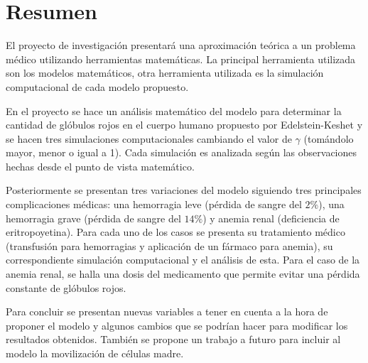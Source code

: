 \chapter*{Resumen}

El proyecto de investigación presentará una aproximación teórica a un problema médico utilizando herramientas matemáticas. La principal herramienta utilizada son los modelos matemáticos, otra herramienta utilizada es la simulación computacional de cada modelo propuesto.

En el proyecto se hace un análisis matemático del modelo para determinar la cantidad de glóbulos rojos en el cuerpo humano propuesto por Edelstein-Keshet y se hacen tres simulaciones computacionales cambiando el valor de $\gamma$ (tomándolo mayor, menor o igual a 1). Cada simulación es analizada según las observaciones hechas desde el punto de vista matemático. 

Posteriormente se presentan tres variaciones del modelo siguiendo tres principales complicaciones médicas: una hemorragia leve (pérdida de sangre del $2\%$), una hemorragia grave (pérdida de sangre del $14\%$) y anemia renal (deficiencia de eritropoyetina). Para cada uno de los casos se presenta su tratamiento médico (transfusión para hemorragias y aplicación de un fármaco para anemia), su correspondiente simulación computacional y el análisis de esta. Para el caso de la anemia renal, se halla una dosis del medicamento que permite evitar una pérdida constante de glóbulos rojos. 

Para concluir se presentan nuevas variables a tener en cuenta a la hora de proponer el modelo y algunos cambios que se podrían hacer para modificar los resultados obtenidos. También se propone un trabajo a futuro para incluir al modelo la movilización de células madre.

